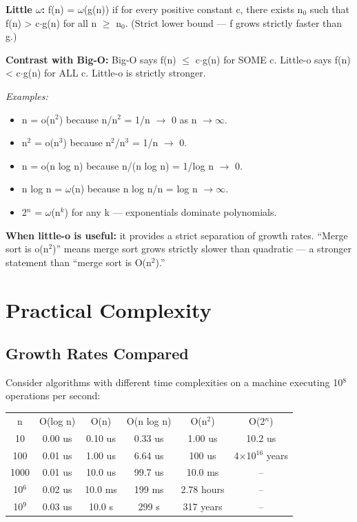 \textbf{Little $\omega $:} f(n) = $\omega $(g(n)) if for every positive constant c, there exists n$_{0}$ such that f(n) > c$\cdot $g(n) for all n $\ge $ n$_{0}$. (Strict lower bound — f grows strictly faster than g.)

\textbf{Contrast with Big-O:} Big-O says f(n) $\le $ c$\cdot $g(n) for SOME c. Little-o says f(n) < c$\cdot $g(n) for ALL c. Little-o is strictly stronger.

\textit{Examples:}
\begin{itemize}
\item n = o(n$^{2}$) because n/n$^{2}$ = 1/n $\to$ 0 as n $\to \infty $.
\item n$^{2}$ = o(n$^{3}$) because n$^{2}$/n$^{3}$ = 1/n $\to$ 0.
\item n = o(n log n) because n/(n log n) = 1/log n $\to$ 0.
\item n log n = $\omega $(n) because n log n/n = log n $\to \infty $.
\item 2$^{n}$ = $\omega $(n$^{k}$) for any k — exponentials dominate polynomials.
\end{itemize}

\textbf{When little-o is useful:} it provides a strict separation of growth rates. ``Merge sort is o(n$^{2}$)'' means merge sort grows strictly slower than quadratic — a stronger statement than ``merge sort is O(n$^{2}$).''

\section{Practical Complexity}

\subsection{Growth Rates Compared}

Consider algorithms with different time complexities on a machine executing 10$^{8}$ operations per second:

\begin{center}
\begin{tabular}{cccccc}
\toprule
n & O(log n) & O(n) & O(n log n) & O(n$^{2}$) & O(2$^{n}$) \\
10 & 0.00 us & 0.10 us & 0.33 us & 1.00 us & 10.2 us \\
100 & 0.01 us & 1.00 us & 6.64 us & 100 us & 4$\times $10$^{16}$ years \\
1000 & 0.01 us & 10.0 us & 99.7 us & 10.0 ms & -- \\
10$^{6}$ & 0.02 us & 10.0 ms & 199 ms & 2.78 hours & -- \\
10$^{9}$ & 0.03 us & 10.0 s & 299 s & 317 years & -- \\

\bottomrule
\end{tabular}
\end{center}
